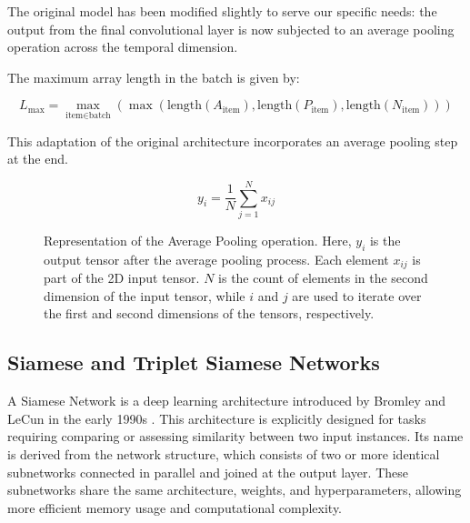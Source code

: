 The original model has been modified slightly to serve our specific needs: the output from the final convolutional layer is now subjected to an average pooling operation across the temporal dimension.


The maximum array length in the batch is given by:

\begin{equation}
L_{\text{max}} = \max_{\text{item} \in \text{batch}}(\max(\text{length}(A_{\text{item}}), \text{length}(P_{\text{item}}), \text{length}(N_{\text{item}})))
\end{equation}

This adaptation of the original architecture incorporates an average pooling step at the end.

\begin{figure}[ht]
\centering
\begin{equation}
y_i = \frac{1}{N} \sum_{j=1}^{N} x_{ij}
\end{equation}
\caption[Average Pooling operation]{\small{Representation of the Average Pooling operation. Here, $y_i$ is the output tensor after the average pooling process. Each element $x_{ij}$ is part of the 2D input tensor. $N$ is the count of elements in the second dimension of the input tensor, while $i$ and $j$ are used to iterate over the first and second dimensions of the tensors, respectively.}}
\end{figure}








\subsection{Siamese and Triplet Siamese Networks}

A Siamese Network is a deep learning architecture introduced by Bromley and LeCun in the early 1990s \cite{Bromley1993SignatureNetwork}. This architecture is explicitly designed for tasks requiring comparing or assessing similarity between two input instances. Its name is derived from the network structure, which consists of two or more identical subnetworks connected in parallel and joined at the output layer. These subnetworks share the same architecture, weights, and hyperparameters, allowing more efficient memory usage and computational complexity.

